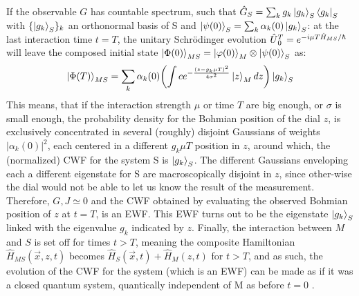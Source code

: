 \documentclass[11pt, a4paper]{article} %
\begin{document}
If the observable $G$ has countable spectrum, such that $\hat{G}_S=\sum_k g_k \ket{g_k}_S\bra{g_k}_S$ with $\{\ket{g_k}_S\}_k$ an orthonormal basis of S and $\ket{\psi(0)}_S=\sum_k \alpha_k(0)\ket{g_k}_S$: at the last interaction time $t=T$, the unitary Schrödinger evolution $\hat{U} \null_{0}^T=e^{-i\mu T \hat{H}_{MS}/\hbar}$ will leave the composed initial state $\ket{\Phi(0)}_{MS}=\ket{\varphi(0)}_M\otimes\ket{\psi(0)}_S$ as:\vspace{-0.15cm}
\begin{equation}\label{postM1}
\ket{\Phi(T)}_{MS}=\sum_k \alpha_k(0)\qty(\int c e^{-\frac{(z-g_k\mu T)^2}{4\sigma^2}}\ket{z}_M dz )\ket{g_k}_S
\end{equation}
This means, that if the interaction strength $\mu$ or time $T$ are big enough, or $\sigma$ is small enough, the probability density for the Bohmian position of the dial $z$, is exclusively concentrated in several (roughly) disjoint Gaussians of weights $|\alpha_k(0)|^2$, each centered in a different $g_k \mu T$ position in $z$, around which, the (normalized) CWF for the system S is $\ket{g_k}_S$. The different Gaussians enveloping each a different eigenstate for S are macroscopically disjoint in $z$, since other-wise the dial would not be able to let us know the result of the measurement. Therefore, $G,J\simeq 0$ and the CWF obtained by evaluating the observed Bohmian position of $z$ at $t=T$, is an EWF. This EWF turns out to be the eigenstate $\ket{g_k}_S$ linked with the eigenvalue $g_k$ indicated by $z$. Finally, the interaction between $M$ and $S$ is set off for times $t>T$, meaning the composite Hamiltonian $\hat{H}_{MS}(\vec{x},z,t)$ becomes $\hat{H}_S(\vec{x},t)+\hat{H}_M(z,t)$ for $t>T$, and as such, the evolution of the CWF for the system (which is an EWF) can be made as if it was a closed quantum system, quantically independent of M as before $t=0$ \cite{JordiXavier}. 

\end{document}
